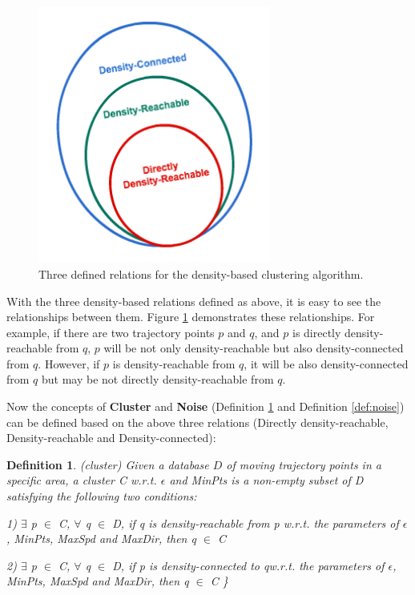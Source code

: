 \documentclass[12pt,glossary]{dalcsthesis}
\newtheorem{definition}{Definition}
\begin{document}
\begin{figure}[!htb]
\centering
\includegraphics[width=3in]{relations.png}%
\caption{Three defined relations for the density-based clustering algorithm.}
\label{fig:relations}
\end{figure}


With the three density-based relations defined as above, it is easy to see the relationships between them. Figure \ref{fig:relations} demonstrates these relationships. For example, if there are two trajectory points $p$ and $q$, and $p$ is directly density-reachable from $q$, $p$ will be not only density-reachable but also density-connected from $q$. However, if $p$ is density-reachable from $q$, it will be also density-connected from $q$ but may be not directly density-reachable from $q$. 


Now the concepts of \textbf{Cluster} and \textbf{Noise} (Definition \ref{def:cluster} and Definition \ref{def:noise}) can be defined based on the above three relations (Directly density-reachable, Density-reachable and Density-connected):

\begin{definition}
\label{def:cluster}
(cluster)
Given a database $D$ of moving trajectory points in a specific area, a cluster C w.r.t. $\epsilon$ and MinPts is a non-empty subset of D satisfying the following two conditions:

1) $\exists$ p $\in$ C, $\forall$ q $\in$ D, if q is density-reachable from p w.r.t. the parameters of $\epsilon$, MinPts, MaxSpd and MaxDir, then q $\in$ C

2) $\exists$ p $\in$ C, $\forall$ q $\in$ D, if p is density-connected to qw.r.t. the parameters of $\epsilon$, MinPts, MaxSpd and MaxDir, then q $\in$ C
\}
\end{definition}
\end{document}
